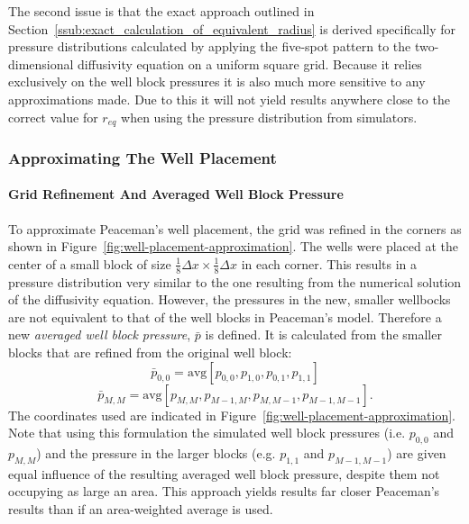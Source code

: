 The second issue is that the exact approach outlined in Section~\ref{ssub:exact_calculation_of_equivalent_radius} is derived specifically for pressure distributions calculated by applying the five-spot pattern to the two-dimensional diffusivity equation on a uniform square grid. Because it relies exclusively on the well block pressures it is also much more sensitive to any approximations made. Due to this it will not yield results anywhere close to the correct value for $r_{eq}$ when using the pressure distribution from simulators.

\subsubsection{Approximating The Well Placement} %
\label{ssub:approximating_the_well_placement}

\paragraph{Grid Refinement And Averaged Well Block Pressure} %
\label{par:grid_refinement_and_averaged_well_block_pressure}
To approximate Peaceman's well placement, the grid was refined in the corners as shown in Figure~\ref{fig:well-placement-approximation}. The wells were placed at the center of a small block of size $\frac{1}{8}\Delta x\times \frac{1}{8}\Delta x$ in each corner. This results in a pressure distribution very similar to the one resulting from the numerical solution of the diffusivity equation. However, the pressures in the new, smaller wellbocks are not equivalent to that of the well blocks in Peaceman's model. Therefore a new \emph{averaged well block pressure}, $\bar{p}$ is defined. It is calculated from the smaller blocks that are refined from the original well block:
\begin{equation}
    \bar{p}_{0,0} = \mathrm{avg}\left[ p_{0,0}, p_{1,0}, p_{0,1}, p_{1,1} \right]
\end{equation}
\begin{equation}
    \bar{p}_{M,M} = \mathrm{avg}\left[ p_{M,M}, p_{M-1,M}, p_{M,M-1}, p_{M-1,M-1} \right].
\end{equation}
The coordinates used are indicated in Figure~\ref{fig:well-placement-approximation}. Note that using this formulation the simulated well block pressures (i.e. $p_{0,0}$ and $p_{M,M}$) and the pressure in the larger blocks (e.g. $p_{1,1}$ and $p_{M-1,M-1}$) are given equal influence of the resulting averaged well block pressure, despite them not occupying as large an area.  This approach yields results far closer Peaceman's results than if an area-weighted average is used.


